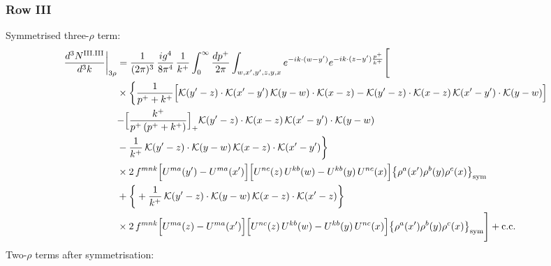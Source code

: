 \documentclass[9pt]{article}
\numberwithin{equation}{section}
\begin{document}
\subsubsection*{Row III}
Symmetrised three-$\rho$ term:
\begin{align}
\frac{d^{3}N^{\rm III.III}}{d^{3}k}\bigg|_{3\rho}&=\frac{1}{(2\pi)^{3}}\,\frac{ig^{4}}{8\pi^{4}}\,\frac{1}{k^{+}}\int_{0}^{\infty}\frac{dp^{+}}{2\pi}\int_{w,x',y',z,y,x}e^{-ik\cdot{(w-y')}}e^{-ik\cdot{(z-y')}\frac{p^{+}}{k^{+}}}\Bigg[\notag\\
&\times\bigg\{\frac{1}{p^{+}+k^{+}}\Big[\mathcal{K}(y'-z)\cdot\mathcal{K}(x'-y')\,\mathcal{K}(y-w)\cdot\mathcal{K}(x-z)-\mathcal{K}(y'-z)\cdot\mathcal{K}(x-z)\,\mathcal{K}(x'-y')\cdot\mathcal{K}(y-w)\Big]\notag\\
&{-\Big[\frac{k^{+}}{p^{+}\,(p^{+}+k^{+})}\Big]_{+}\mathcal{K}(y'-z)\cdot\mathcal{K}(x-z)\,\mathcal{K}(x'-y')\cdot\mathcal{K}(y-w)}\notag\\
&-\frac{1}{k^{+}}\,\mathcal{K}(y'-z)\cdot\mathcal{K}(y-w)\,\mathcal{K}(x-z)\cdot\mathcal{K}(x'-y')\bigg\}\notag\\
&\times 2\,f^{mnk}\Big[U^{ma}(y')-U^{ma}(x')\Big]\Big[U^{nc}(z)\,U^{kb}(w)-U^{kb}(y)\,U^{nc}(x)\Big]\big\{\rho^{a}(x')\rho^{b}(y)\rho^{c}(x)\big\}_{\rm sym}\notag\\
&+\bigg\{+\frac{1}{k^{+}}\,\mathcal{K}(y'-z)\cdot\mathcal{K}(y-w)\,\mathcal{K}(x-z)\cdot\mathcal{K}(x'-z)\bigg\}\notag\\
&\times 2\,f^{mnk}\Big[U^{ma}(z)-U^{ma}(x')\Big]\Big[U^{nc}(z)\,U^{kb}(w)-U^{kb}(y)\,U^{nc}(x)\Big]\big\{\rho^{a}(x')\rho^{b}(y)\rho^{c}(x)\big\}_{\rm sym}\Bigg]+{\rm c.c.}\label{eq:D-III.III-3}
\end{align}
 Two-$\rho$ terms after symmetrisation:
\end{document}

